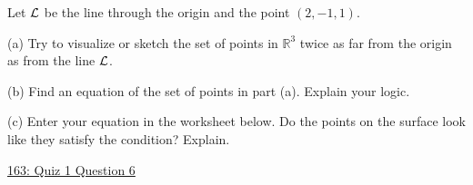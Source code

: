 \documentclass{ximera}
\begin{document}
\begin{question}  \label{Q43532432423432}
Let ${\cal L}$ be the line through the origin and the point $(2,-1,1)$.

(a) Try to visualize or sketch the set of points in $\mathbb{R}^3$  twice as far from the origin as from the line ${\cal L}$.

(b) Find an equation of the set of points in part (a). Explain your logic.

(c) Enter  your equation in the worksheet below. Do the points on the surface look like they satisfy the condition? Explain.

\begin{onlineOnly}
    \begin{center}
\end{center}
\end{onlineOnly}

\href{https://www.desmos.com/3d/wzv6plrbe6}{163: Quiz 1 Question 6}
\end{question}
\end{document}
